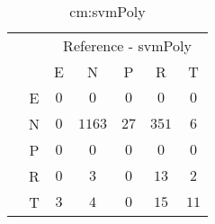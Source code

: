 \begin{table}[!ht]
	\centering
	\begin{tabular}{|c|c|c|c|c|c|c|}
		\cline{3-7}
		\multicolumn{2}{c|}{} & \multicolumn{5}{|c|}{Reference - svmPoly} \\ \cline{3-7}
		\multicolumn{2}{c|}{} & E & N & P & R & T \\ \hline
		\multirow{5}{*}{\rotatebox{90}{Prediction}} & E & $0$ & $0$ & $0$ & $0$ & $0$ \\ \cline{2-7}
		 & N & $0$ & $1163$ & $27$ & $351$ & $6$ \\ \cline{2-7}
		 & P & $0$ & $0$ & $0$ & $0$ & $0$ \\ \cline{2-7}
		 & R & $0$ & $3$ & $0$ & $13$ & $2$ \\ \cline{2-7}
		 & T & $3$ & $4$ & $0$ & $15$ & $11$ \\ \hline
	\end{tabular}
	\caption{cm:svmPoly}
	\label{tab:cm:svmPoly}
\end{table}
